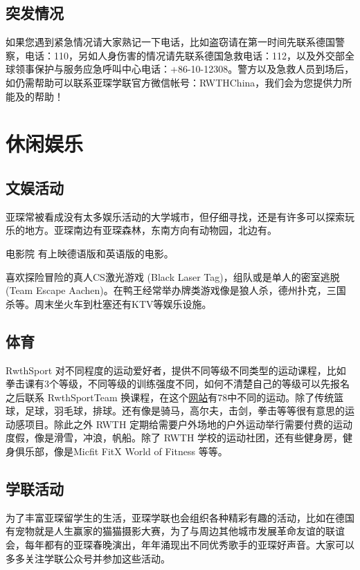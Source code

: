   \subsection{突发情况}\label{subsec:突发情况}

    如果您遇到紧急情况请大家熟记一下电话，比如盗窃请在第一时间先联系德国警察，电话：110，另如人身伤害的情况请先联系德国急救电话：112，以及外交部全球领事保护与服务应急呼叫中心电话：+86-10-12308。警方以及急救人员到场后，如仍需帮助可以联系亚琛学联官方微信帐号：RWTHChina，我们会为您提供力所能及的帮助！

\section{休闲娱乐}\label{sec:休闲娱乐}

  \subsection{文娱活动}\label{subsec:文娱活动}

    亚琛常被看成没有太多娱乐活动的大学城市，但仔细寻找，还是有许多可以探索玩乐的地方。亚琛南边有亚琛森林，东南方向有动物园，北边有。

    电影院  有上映德语版和英语版的电影。

    喜欢探险冒险的真人CS激光游戏 (Black Laser Tag)，组队或是单人的密室逃脱 (Team Escape Aachen)。在鸭王经常举办牌类游戏像是狼人杀，德州扑克，三国杀等。周末坐火车到杜塞还有KTV等娱乐设施。

  \subsection{体育}\label{subsec:体育}

    RwthSport 对不同程度的运动爱好者，提供不同等级不同类型的运动课程，比如拳击课有3个等级，不同等级的训练强度不同，如何不清楚自己的等级可以先报名之后联系 RwthSportTeam 换课程，在这个\href{https://hochschulsport.rwth-aachen.de/cms/HSZ/Sport/Erweitertes-Uebergangsprogramm/~hpoua/Sportartensuche/}{网站}有78中不同的运动。除了传统篮球，足球，羽毛球，排球。还有像是骑马，高尔夫，击剑，拳击等等很有意思的运动感项目。除此之外 RWTH 定期给需要户外场地的户外运动举行需要付费的运动度假，像是滑雪，冲浪，帆船。除了 RWTH 学校的运动社团，还有些健身房，健身俱乐部，像是Micfit FitX World of Fitness 等等。

  \subsection{学联活动}\label{subsec:学联活动}

    为了丰富亚琛留学生的生活，亚琛学联也会组织各种精彩有趣的活动，比如在德国有宠物就是人生赢家的猫猫摄影大赛，为了与周边其他城市发展革命友谊的联谊会，每年都有的亚琛春晚演出，年年涌现出不同优秀歌手的亚琛好声音。大家可以多多关注学联公众号并参加这些活动。
